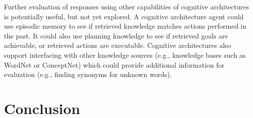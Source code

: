 \documentclass[letterpaper]{article} %
\begin{document}
\vspace{-3.43mm}
\vspace{-3.43mm}
Further evaluation of responses using other capabilities of cognitive architectures is potentially useful, but not yet explored. A cognitive architecture agent could use episodic memory to see if retrieved knowledge matches actions performed in the past. It could also use planning knowledge to see if retrieved goals are achievable, or retrieved actions are executable. Cognitive architectures also support interfacing with other knowledge sources (e.g., knowledge bases such as WordNet or ConceptNet) which could provide additional information for evaluation (e.g., finding synonyms for unknown words).


\section{Conclusion}
\end{document}
